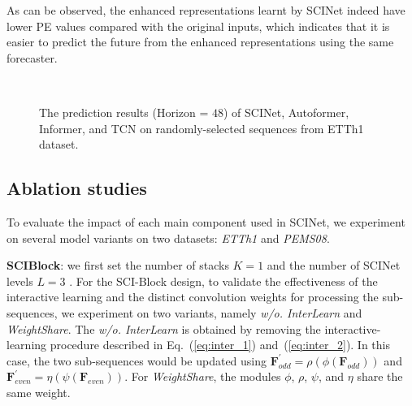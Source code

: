 \documentclass{article}
\begin{document}
As can be observed, the enhanced representations learnt by SCINet indeed have lower PE values compared with the original inputs, which indicates that it is easier to predict the future from the enhanced representations using the same forecaster. 









\begin{figure*}[h]	
	\\

\caption{The prediction results (Horizon = $48$) of SCINet, Autoformer, Informer, and TCN on randomly-selected sequences from ETTh1 dataset. } \vspace{5pt}
	\label{fig:compare}  \end{figure*}


\newpage
\subsection{Ablation studies}
\label{sec:ab}


To evaluate the impact of each main component used in SCINet, we experiment on several model variants on two datasets: \emph{ETTh1} and \emph{PEMS08}. \vspace{5pt}

\textbf{SCIBlock}: we first set the number of stacks $K\!=\!1$ and the number of SCINet levels $L\!=\!3$ . 
For the SCI-Block design, to validate the effectiveness of the interactive learning and the distinct convolution weights for processing the sub-sequences, we experiment on two variants, namely \emph{w/o. InterLearn} and \emph{WeightShare}. 
The \emph{w/o. InterLearn} is obtained by removing the interactive-learning procedure described in Eq.~(\ref{eq:inter_1}) and~(\ref{eq:inter_2}). In this case, the two sub-sequences would be updated using $\mathbf{F}^{'}_{odd}\!=\!\rho(\phi (\mathbf{F}_{odd})) $ and $\mathbf{F}^{'}_{even}\!=\! \eta(\psi (\mathbf{F}_{even})) $. 
For \emph{WeightShare}, the modules $\phi$, $\rho$, $\psi$, and $\eta$ share the same weight. 
\end{document}
